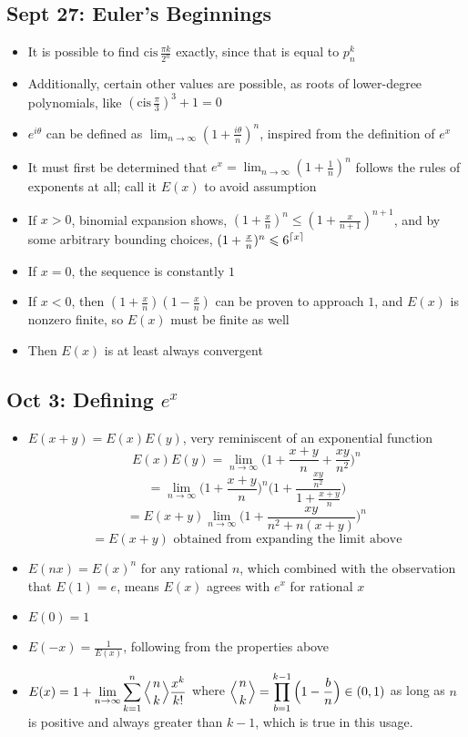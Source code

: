 \documentclass[10pt, oneside]{article}
\newcommand{\lti}[1]{\lim_{#1 \rightarrow \infty}}
\newcommand{\stack}[2]{\genfrac{}{}{0pt}{}{#1}{#2}}
\let\leq\leqslant
\DeclarePairedDelimiter\ceil{\lceil}{\rceil}
\newcommand{\cis}{\text{cis} \,}
\begin{document}
\subsection{Sept 27: Euler's Beginnings}
\begin{itemize}
    \item It is possible to find $\cis \frac{\pi k}{2^n}$ exactly, since that is equal to $p_n^k$
    \item Additionally, certain other values are possible, as roots of lower-degree polynomials, like $(\cis \frac{\pi}{3})^3 + 1 = 0$
    \item $e^{i \theta}$ can be defined as $\lti{n} (1 + \frac{i \theta}{n})^n$, inspired from the definition of $e^x$
    \item It must first be determined that $e^x = \lti{n} (1 + \frac{1}{n})^n$ follows the rules of exponents at all; call it $E(x)$ to avoid assumption
    \item If $x > 0$, binomial expansion shows, $(1 + \frac{x}{n})^n \leq (1 + \frac{x}{n+1})^{n+1}$, and by some arbitrary bounding choices, $(1 + \frac{x}{n})^n \leq 6^{\ceil{x}}$
    \item If $x = 0$, the sequence is constantly $1$
    \item If $x < 0$, then $(1+\frac{x}{n})(1-\frac{x}{n})$ can be proven to approach $1$, and $E(x)$ is nonzero finite, so $E(x)$ must be finite as well
    \item Then $E(x)$ is at least always convergent
\end{itemize}

\subsection{Oct 3: Defining $e^x$}
\begin{itemize}
    \item $E(x+y) = E(x)E(y)$, very reminiscent of an exponential function
        \[E(x)E(y) = \lti{n} \Big( 1 + \frac{x+y}{n} + \frac{xy}{n^2} \Big) ^n\]
        \[= \lti{n} \Big( 1 + \frac{x+y}{n} \Big) ^n \bigg( 1 + \frac{\frac{xy}{n^2}}{1 + \frac{x+y}{n}} \bigg)\]
        \[= E(x+y) \lti{n} \Big( 1 + \frac{xy}{n^2 + n(x+y)} \Big)^n\]
        \[= E(x+y) \text{ obtained from expanding the limit above}\]
    \item $E(nx) = E(x)^n$ for any rational $n$, which combined with the observation that $E(1) = e$, means $E(x)$ agrees with $e^x$ for rational $x$
    \item $E(0) = 1$
    \item $E(-x) = \frac{1}{E(x)}$, following from the properties above
    \item $\displaystyle E(x) = 1 + \lti{n} \sum_{k=1}^n \Big\langle \stack{n}{k} \Big\rangle \frac{x^k}{k!} $ where $\displaystyle \Big\langle \stack{n}{k}\Big\rangle = \prod_{b = 1}^{k-1} \Big( 1 - \frac{b}{n} \Big) \in (0,1)$ as long as $n$ is positive and always greater than $k - 1$, which is true in this usage.
\end{itemize}
\end{document}

